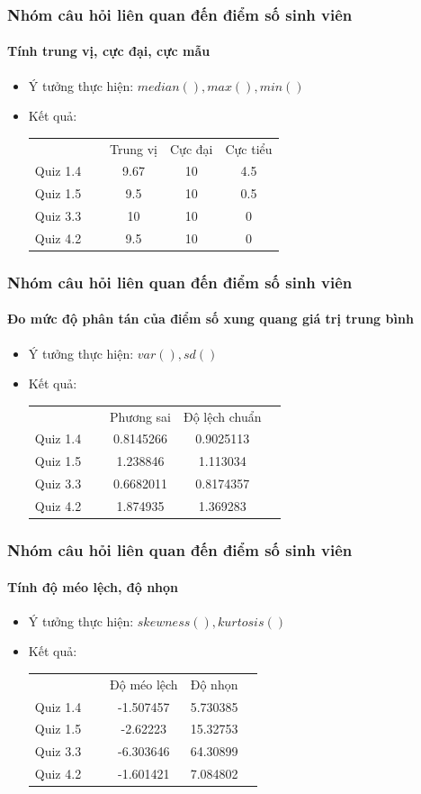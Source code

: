 \documentclass[english,10pt,table]{beamer}
\begin{document}
\frame
{
\frametitle{Nhóm câu hỏi liên quan đến điểm số sinh viên}
\framesubtitle{Tính trung vị, cực đại, cực mẫu}
\begin{itemize}
    \item Ý tưởng thực hiện: $median(), max(), min()$
    \item Kết quả:\\
    \begin{center}
        \begin{tabular}{l l c c c}
             & & Trung vị & Cực đại & Cực tiểu\\
             Quiz 1.4 & $\;$ & 9.67 & 10 & 4.5\\
             Quiz 1.5 & $\;$ & 9.5 & 10 & 0.5\\
             Quiz 3.3 & $\;$ & 10 & 10 & 0\\
             Quiz 4.2 & $\;$ & 9.5 & 10 & 0
        \end{tabular}
    \end{center}
\end{itemize}
}

\frame
{
\frametitle{Nhóm câu hỏi liên quan đến điểm số sinh viên}
\framesubtitle{Đo mức độ phân tán của điểm số xung quang giá trị trung bình}
\begin{itemize}
    \item Ý tưởng thực hiện: $var(), sd()$
    \item Kết quả:\\
    \begin{center}
        \begin{tabular}{l l c c c}
             & & Phương sai & Độ lệch chuẩn\\
             Quiz 1.4 & $\;$ & 0.8145266 & 0.9025113\\
             Quiz 1.5 & $\;$ & 1.238846 & 1.113034\\
             Quiz 3.3 & $\;$ & 0.6682011 & 0.8174357\\
             Quiz 4.2 & $\;$ & 1.874935 & 1.369283
        \end{tabular}
    \end{center}
\end{itemize}
}

\frame
{
\frametitle{Nhóm câu hỏi liên quan đến điểm số sinh viên}
\framesubtitle{Tính độ méo lệch, độ nhọn}
\begin{itemize}
    \item Ý tưởng thực hiện: $skewness(), kurtosis()$
    \item Kết quả:\\
    \begin{center}
        \begin{tabular}{l l c c c}
             & & Độ méo lệch & Độ nhọn\\
             Quiz 1.4 & $\;$ & -1.507457 & 5.730385\\
             Quiz 1.5 & $\;$ & -2.62223 & 15.32753\\
             Quiz 3.3 & $\;$ & -6.303646 & 64.30899\\
             Quiz 4.2 & $\;$ & -1.601421 & 7.084802
        \end{tabular}
    \end{center}
\end{itemize}
}
\end{document}
